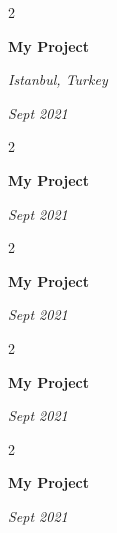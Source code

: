 \documentclass[10pt, letterpaper]{article}
\newenvironment{twocolentry}[2][]{
    \onecolentry
    \def\secondColumn{#2}
    \setcolumnwidth{\fill, 4.5 cm}
    \begin{paracol}{2}
}{
    \switchcolumn \raggedleft \secondColumn
    \end{paracol}
    \endonecolentry
} %
\begin{document}
        \vspace{0.2 cm}

        \begin{twocolentry}{
        \textit{Istanbul, Turkey}    
            
        \textit{Sept 2021}}
            \textbf{My Project}
        \end{twocolentry}



        \vspace{0.2 cm}

        \begin{twocolentry}{
            
            
        \textit{Sept 2021}}
            \textbf{My Project}
        \end{twocolentry}



        \vspace{0.2 cm}

        \begin{twocolentry}{
            
            
        \textit{Sept 2021}}
            \textbf{My Project}
        \end{twocolentry}



        \vspace{0.2 cm}

        \begin{twocolentry}{
            
            
        \textit{Sept 2021}}
            \textbf{My Project}
        \end{twocolentry}



        \vspace{0.2 cm}

        \begin{twocolentry}{
            
            
        \textit{Sept 2021}}
            \textbf{My Project}
        \end{twocolentry}
\end{document}

